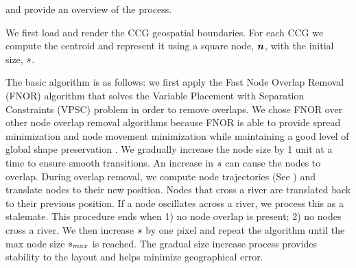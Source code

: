  and  provide an overview of the process.

 We first load and render the CCG geospatial boundaries. For each CCG we compute the centroid and represent it using a square node, $ \bm{n} $, with the initial size, $ s $. 

 The basic algorithm is as follows: we first apply the Fast Node Overlap Removal (FNOR) algorithm that solves the Variable Placement with Separation Constraints (VPSC) problem \cite{dwyer2006fast} in order to remove overlaps. We chose FNOR over other node overlap removal algorithms because FNOR is able to provide spread minimization and node movement minimization while maintaining a good level of global shape preservation \cite{chen2020Node}. We gradually increase the node size by 1 unit at a time to ensure smooth transitions. An increase in $ s $ can cause the nodes to overlap. During overlap removal, we compute node trajectories (See ) and translate nodes to their new position. Nodes that cross a river are translated back to their previous position. If a node oscillates across a river, we process this as a stalemate. This procedure ends when 1) no node overlap is present; 2) no nodes cross a river. We then increase $ s $ by one pixel and repeat the algorithm until the max node size $ s_{max} $ is reached. The gradual size increase process provides stability to the layout and helps minimize geographical error.


